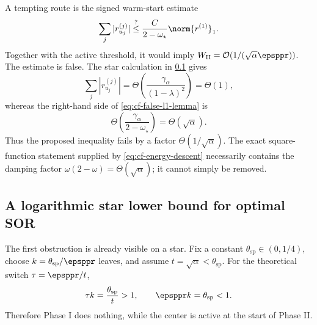 A tempting route is the signed warm-start estimate
\begin{equation}
    \sum_j |r_{u_j}^{(j)}|
    \stackrel{?}{\leq}
    \frac{C}{2-\omega_\star}\norm{r^{(1)}}_1.
    \label{eq:cf-false-l1-lemma}
\end{equation}
Together with the active threshold, it would imply
\(W_{\rm II}=\mathcal O(1/(\sqrt\alpha\epsppr))\).  The estimate is false.
The star calculation in \cref{subsec:cf-star-lower} gives
\begin{equation}
    \sum_j |r_{u_j}^{(j)}|
    =\Theta\!\left(
       \frac{\gamma_\alpha}{(1-\lambda)^2}
      \right)
    =\Theta(1),
    \label{eq:cf-star-absolute-mass}
\end{equation}
whereas the right-hand side of \cref{eq:cf-false-l1-lemma} is
\begin{equation}
    \Theta\!\left(
      \frac{\gamma_\alpha}{2-\omega_\star}
    \right)
    =\Theta(\sqrt\alpha).
    \label{eq:cf-false-l1-rhs}
\end{equation}
Thus the proposed inequality fails by a factor
\(\Theta(1/\sqrt\alpha)\).  The exact square-function statement supplied by
\cref{eq:cf-energy-descent} necessarily contains the damping factor
\(\omega(2-\omega)=\Theta(\sqrt\alpha)\); it cannot simply be removed.

\subsection{A logarithmic star lower bound for optimal SOR}
\label{subsec:cf-star-lower}

The first obstruction is already visible on a star.  Fix a constant
\(\theta_{\mathrm{sp}}\in(0,1/4)\), choose \(k=\theta_{\mathrm{sp}}/\epsppr\) leaves, and assume
\(t=\sqrt\alpha<\theta_{\mathrm{sp}}\).  For the theoretical switch
\(\tau=\epsppr/t\),
\begin{equation}
    \tau k=\frac{\theta_{\mathrm{sp}}}{t}>1,
    \qquad
    \epsppr k=\theta_{\mathrm{sp}}<1.
    \label{eq:cf-star-bypass}
\end{equation}
Therefore Phase I does nothing, while the center is active at the start of
Phase II.

